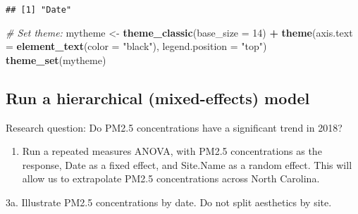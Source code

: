 \documentclass[]{article}
\newenvironment{Shaded}{\begin{snugshade}}{\end{snugshade}}
\newcommand{\KeywordTok}[1]{\textcolor[rgb]{0.13,0.29,0.53}{\textbf{#1}}}
\newcommand{\DataTypeTok}[1]{\textcolor[rgb]{0.13,0.29,0.53}{#1}}
\newcommand{\DecValTok}[1]{\textcolor[rgb]{0.00,0.00,0.81}{#1}}
\newcommand{\FloatTok}[1]{\textcolor[rgb]{0.00,0.00,0.81}{#1}}
\newcommand{\StringTok}[1]{\textcolor[rgb]{0.31,0.60,0.02}{#1}}
\newcommand{\CommentTok}[1]{\textcolor[rgb]{0.56,0.35,0.01}{\textit{#1}}}
\newcommand{\OperatorTok}[1]{\textcolor[rgb]{0.81,0.36,0.00}{\textbf{#1}}}
\newcommand{\NormalTok}[1]{#1}
\providecommand{\tightlist}{%
  \setlength{\itemsep}{0pt}\setlength{\parskip}{0pt}}
\begin{document}
\begin{verbatim}
## [1] "Date"
\end{verbatim}

\begin{Shaded}
\begin{Highlighting}[]
\CommentTok{# Set theme:}
\NormalTok{mytheme <-}\StringTok{ }\KeywordTok{theme_classic}\NormalTok{(}\DataTypeTok{base_size =} \DecValTok{14}\NormalTok{) }\OperatorTok{+}
\StringTok{  }\KeywordTok{theme}\NormalTok{(}\DataTypeTok{axis.text =} \KeywordTok{element_text}\NormalTok{(}\DataTypeTok{color =} \StringTok{"black"}\NormalTok{), }
        \DataTypeTok{legend.position =} \StringTok{"top"}\NormalTok{)}
\KeywordTok{theme_set}\NormalTok{(mytheme)}
\end{Highlighting}
\end{Shaded}

\subsection{Run a hierarchical (mixed-effects)
model}\label{run-a-hierarchical-mixed-effects-model}

Research question: Do PM2.5 concentrations have a significant trend in
2018?

\begin{enumerate}
\def\labelenumi{\arabic{enumi}.}
\setcounter{enumi}{2}
\tightlist
\item
  Run a repeated measures ANOVA, with PM2.5 concentrations as the
  response, Date as a fixed effect, and Site.Name as a random effect.
  This will allow us to extrapolate PM2.5 concentrations across North
  Carolina.
\end{enumerate}

3a. Illustrate PM2.5 concentrations by date. Do not split aesthetics by
site.

\begin{Shaded}
\end{Shaded}
\end{document}
